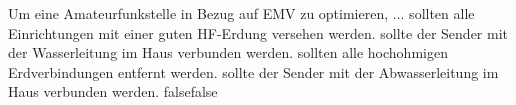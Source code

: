     {Um eine Amateurfunkstelle in Bezug auf EMV zu optimieren, ...}
    {sollten alle Einrichtungen mit einer guten HF-Erdung versehen werden.}
    {sollte der Sender mit der Wasserleitung im Haus verbunden werden.}
    {sollten alle hochohmigen Erdverbindungen entfernt werden.}
    {sollte der Sender mit der Abwasserleitung im Haus verbunden werden.}
    {false}{false}